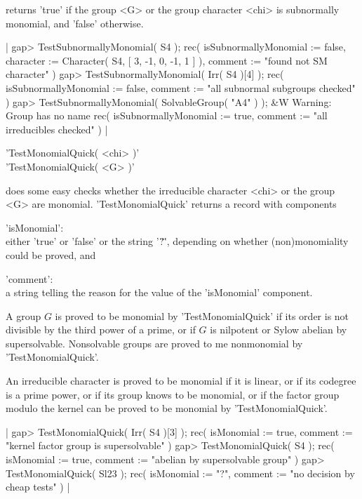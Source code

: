 returns 'true' if the group <G> or the group character <chi> is
subnormally monomial, and 'false' otherwise.

|    gap> TestSubnormallyMonomial( S4 );
    rec(
      isSubnormallyMonomial := false,
      character := Character( S4, [ 3, -1, 0, -1, 1 ] ),
      comment := "found not SM character" )
    gap> TestSubnormallyMonomial( Irr( S4 )[4] );
    rec(
      isSubnormallyMonomial := false,
      comment := "all subnormal subgroups checked" )
    gap> TestSubnormallyMonomial( SolvableGroup( "A4" ) );
    &W  Warning: Group has no name
    rec(
      isSubnormallyMonomial := true,
      comment := "all irreducibles checked" ) |


'TestMonomialQuick( <chi> )'\\
'TestMonomialQuick(  <G>  )'

does some easy checks whether the irreducible character <chi> or the group
<G> are monomial.  'TestMonomialQuick' returns a record with components

'isMonomial': \\ either 'true' or 'false' or the string '\"?\"', depending
                 on whether (non)monomiality could be proved, and

'comment':    \\ a string telling the reason for the value of the
                 'isMonomial' component.

A group $G$ is proved to be monomial by 'TestMonomialQuick' if
its order is not divisible by the third power of a prime, or if $G$ is
nilpotent or Sylow abelian by supersolvable.  Nonsolvable groups are
proved to me nonmonomial by 'TestMonomialQuick'.

An irreducible character is proved to be monomial if it is linear, or if
its codegree is a prime power, or if its group knows to be monomial, or
if the factor group modulo the kernel can be proved to be monomial by
'TestMonomialQuick'.

|    gap> TestMonomialQuick( Irr( S4 )[3] );
    rec(
      isMonomial := true,
      comment := "kernel factor group is supersolvable" )
    gap> TestMonomialQuick( S4 );
    rec(
      isMonomial := true,
      comment := "abelian by supersolvable group" )
    gap> TestMonomialQuick( Sl23 );
    rec(
      isMonomial := "?",
      comment := "no decision by cheap tests" ) |


